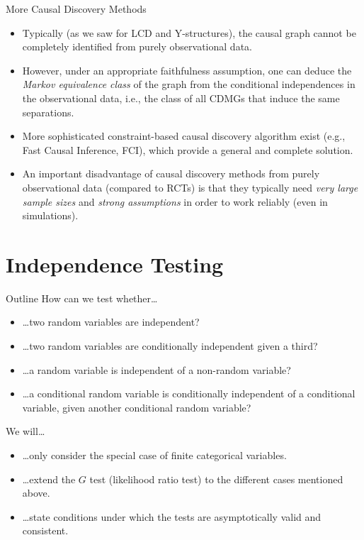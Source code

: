 \begin{frame}{More Causal Discovery Methods}
  \begin{itemize}
    \item Typically (as we saw for LCD and Y-structures), the causal graph cannot be completely identified from purely observational data.
    \item However, under an appropriate faithfulness assumption, one can deduce the \emph{Markov
  equivalence class} of the graph from the conditional independences in the observational data, 
  i.e., the class of all CDMGs that induce the same separations.
    \item More sophisticated constraint-based causal discovery algorithm exist (e.g., Fast Causal Inference, FCI), which provide a general and complete solution.
    \item An important disadvantage of causal discovery methods from purely observational data (compared to RCTs) is that
      they typically need \emph{very large sample sizes} and \emph{strong assumptions} in order to work reliably (even in simulations).
  \end{itemize}
\end{frame}



\part{Independence Testing}
\frame{\partpage}

\begin{frame}{Outline}
How can we test whether\dots
\begin{itemize}
  \item \dots two random variables are independent?
  \item \dots two random variables are conditionally independent given a third?
  \item \dots a random variable is independent of a non-random variable?
  \item \dots a conditional random variable is conditionally independent of a conditional variable, given another conditional random variable?
\end{itemize}

\bigskip
We will\dots
  \begin{itemize}
    \item \dots only consider the special case of finite categorical variables.
    \item \dots extend the $G$ test (likelihood ratio test) to the different cases mentioned above.
    \item \dots state conditions under which the tests are asymptotically valid and consistent.
  \end{itemize}
\end{frame}

